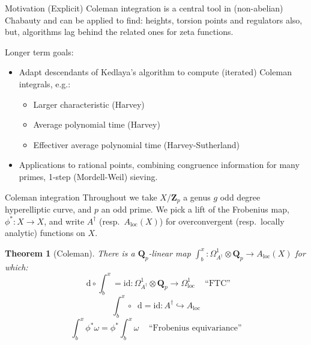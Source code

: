 \documentclass[notheorems]{beamer}
\theoremstyle{plain}
\newtheorem{theorem}{Theorem}[section]
\theoremstyle{definition}
\theoremstyle{definition}
\theoremstyle{definition}
\newcommand{\diff}{\mathop{}\!\mathrm{d}}
\newcommand{\ZZ}{\mathbf{Z}}
\newcommand{\QQ}{\mathbf{Q}}
\begin{document}

\begin{frame}{Motivation}
    (Explicit) Coleman integration is a central tool in (non-abelian) Chabauty and can be applied to find: heights, torsion points and  regulators also, but, algorithms lag behind the related ones for zeta functions.
    \pause%

    Longer term goals:
    \begin{itemize}[<+->]
        \item Adapt descendants of Kedlaya's algorithm to compute (iterated) Coleman integrals, e.g.:
            \begin{itemize}[<+->]
                \item Larger characteristic (Harvey)
                \item Average polynomial time (Harvey)
                \item Effectiver average polynomial time (Harvey-Sutherland)
            \end{itemize}
        \item Applications to rational points, combining congruence information for many primes, 1-step (Mordell-Weil) sieving.
    \end{itemize}
\end{frame}


\begin{frame}{Coleman integration}
    Throughout we take \(X/\ZZ_p\) a genus \(g\) odd degree hyperelliptic curve, and \(p\) an odd prime.
    We pick a lift of the Frobenius map, \(\phi^*\colon X \to X\), and write \(A^\dagger\) (resp.\ \(A_{\text{loc}}(X)\)) for overconvergent (resp.\ locally analytic) functions on \(X\).
    \pause%
    \begin{theorem}[{Coleman}]\label{thm-coleman-harvey-int}
        \hypertarget{p-2914}{}%
        There is a \(\QQ_p\)-linear map \(\int_b^x\colon \Omega_{A^\dagger}^1\otimes \QQ_p \to A_\mathrm{loc} (X)\) for which:\leavevmode%
        \[\diff \circ \int_b^x = \mathrm{id}\colon \Omega_{A^\dagger}^1\otimes \QQ_p \to \Omega_{\text{loc}}^1\,\quad\text{``FTC''}\]%
        \[\int_b^x\circ\diff = \mathrm{id}\colon A^\dagger \hookrightarrow A_{\mathrm{loc}}\]%
        \[\int_b^x \phi^*\omega = \phi^*\int_b^x \omega\,\quad\text{``Frobenius equivariance''}\]%
    \end{theorem}
\end{frame}
\end{document}
